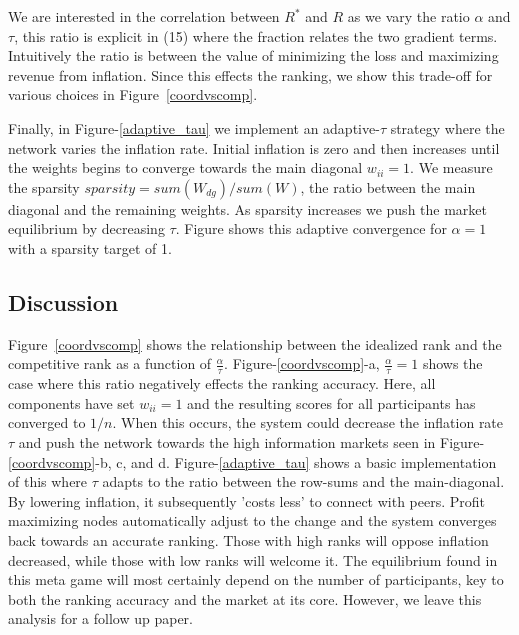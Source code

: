 \documentclass{article}
\begin{document}
We are interested in the correlation between $R^*$ and $R$ as we vary the ratio $\alpha$ and $\tau$, this ratio is explicit in (15) where the fraction relates the two gradient terms. Intuitively the ratio is between the value of minimizing the loss and maximizing revenue from inflation. Since this effects the ranking, we show this trade-off for various choices in Figure~\ref{coordvscomp}. 
\smallskip

Finally, in Figure-\ref{adaptive_tau} we implement an adaptive-$\tau$ strategy where the network varies the inflation rate. Initial inflation is zero and then increases until the weights begins to converge towards the main diagonal $w_{ii}=1$. We measure the sparsity $sparsity = sum(W_{dg})/sum(W)$, the ratio between the main diagonal and the remaining weights. As sparsity increases we push the market equilibrium by decreasing $\tau$. Figure shows this adaptive convergence for $\alpha=1$ with a sparsity target of 1.
\smallskip

\subsection{Discussion}

Figure~\ref{coordvscomp} shows the relationship between the idealized rank and the competitive rank as a function of $\frac{\alpha}{\tau}$. Figure-\ref{coordvscomp}-a, $\frac{\alpha}{\tau} = 1$ shows the case where this ratio negatively effects the ranking accuracy. Here, all components have set $w_{ii} = 1$ and the resulting scores for all participants has converged to $1/n$. When this occurs, the system could decrease the inflation rate $\tau$ and push the network towards the high information markets seen in Figure-\ref{coordvscomp}-b, c, and d. Figure-\ref{adaptive_tau} shows a basic implementation of this where $\tau$ adapts to the ratio between the row-sums and the main-diagonal. By lowering inflation, it subsequently 'costs less' to connect with peers. Profit maximizing nodes automatically adjust to the change and the system converges back towards an accurate ranking. Those with high ranks will oppose inflation decreased, while those with low ranks will welcome it. The equilibrium found in this meta game will most certainly depend on the number of participants, key to both the ranking accuracy and the market at its core. However, we leave this analysis for a follow up paper. 
\smallskip
\end{document}
